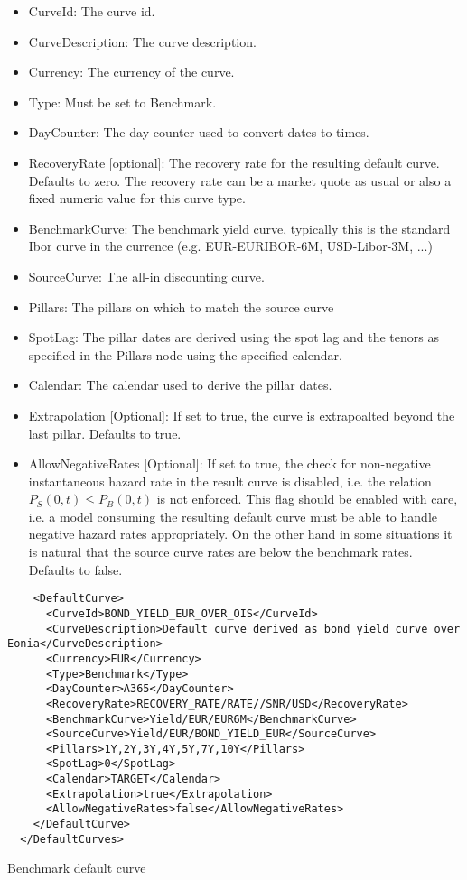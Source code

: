 \begin{itemize}
\item CurveId: The curve id.
\item CurveDescription: The curve description.
\item Currency: The currency of the curve.
\item Type: Must be set to Benchmark.
\item DayCounter: The day counter used to convert dates to times.
\item RecoveryRate [optional]: The recovery rate for the resulting default curve. Defaults to zero. The recovery rate
  can be a market quote as usual or also a fixed numeric value for this curve type.
\item BenchmarkCurve: The benchmark yield curve, typically this is the standard Ibor curve in the currence
  (e.g. EUR-EURIBOR-6M, USD-Libor-3M, ...)
\item SourceCurve: The all-in discounting curve.
\item Pillars: The pillars on which to match the source curve
\item SpotLag: The pillar dates are derived using the spot lag and the tenors as specified in the Pillars node using the
  specified calendar.
\item Calendar: The calendar used to derive the pillar dates.
\item Extrapolation [Optional]: If set to true, the curve is extrapoalted beyond the last pillar. Defaults to true.
\item AllowNegativeRates [Optional]: If set to true, the check for non-negative instantaneous hazard rate in the result
  curve is disabled, i.e. the relation $P_S(0,t) \leq P_B(0,t)$ is not enforced. This flag should be enabled with care,
  i.e.  a model consuming the resulting default curve must be able to handle negative hazard rates appropriately. On the
  other hand in some situations it is natural that the source curve rates are below the benchmark rates. Defaults to
  false.
\end{itemize}

\begin{longlisting}
\begin{verbatim}
    <DefaultCurve>
      <CurveId>BOND_YIELD_EUR_OVER_OIS</CurveId>
      <CurveDescription>Default curve derived as bond yield curve over Eonia</CurveDescription>
      <Currency>EUR</Currency>
      <Type>Benchmark</Type>
      <DayCounter>A365</DayCounter>
      <RecoveryRate>RECOVERY_RATE/RATE//SNR/USD</RecoveryRate>
      <BenchmarkCurve>Yield/EUR/EUR6M</BenchmarkCurve>
      <SourceCurve>Yield/EUR/BOND_YIELD_EUR</SourceCurve>
      <Pillars>1Y,2Y,3Y,4Y,5Y,7Y,10Y</Pillars>
      <SpotLag>0</SpotLag>
      <Calendar>TARGET</Calendar>
      <Extrapolation>true</Extrapolation>
      <AllowNegativeRates>false</AllowNegativeRates>
    </DefaultCurve>
  </DefaultCurves>
\end{verbatim}
\caption{Benchmark default curve}
\label{lst:defaultcurve_benchmark}
\end{longlisting}

